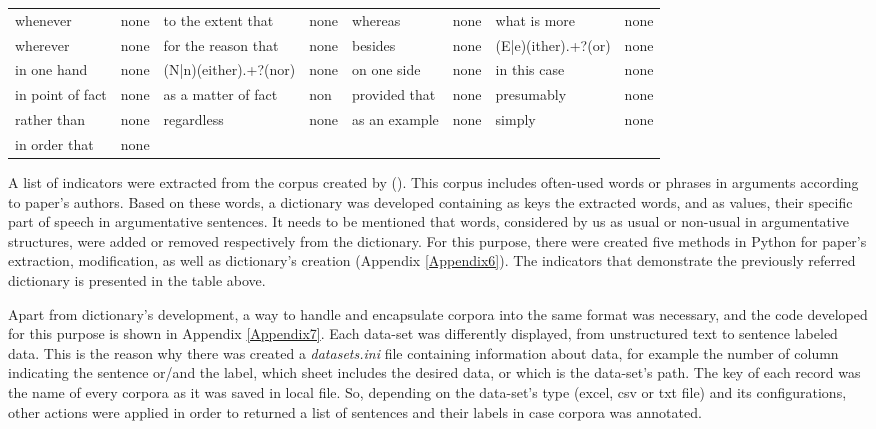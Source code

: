 {{\begin{tabular}{ |p{3.5cm}|p{1cm}|p{4cm}|p{3cm}|p{3.5cm}|p{1cm}|p{5cm}|p{2.5cm}| }
			whenever			&none		&to the extent that		&none
					&whereas			&none		&what is more						&none\\
			wherever			&none		&for the reason that	&none
					&besides			&none		&(E|e)(ither).+?(or)				&none\\
			in one hand			&none		&(N|n)(either).+?(nor)	&none
					&on one side		&none		&in this case						&none\\
			in point of fact	&none		&as a matter of fact	&non
					&provided that		&none		&presumably							&none\\
			rather than			&none		&regardless				&none
					&as an example		&none		&simply								&none\\
			in order that		&none		& 						& 
					& 					& 			& 									& 	\\ 
					
			\hline
\end{tabular}}}

A list of indicators were extracted from the corpus created by (\cite{knott1994using}). This corpus includes often-used words or phrases in arguments according to paper's authors. Based on these words, a dictionary was developed containing as keys the extracted words, and as values, their specific part of speech in argumentative sentences. It needs to be mentioned that words, considered by us as usual or non-usual in argumentative structures, were added or removed respectively from the dictionary. For this purpose, there were created five methods in Python for paper's extraction, modification, as well as dictionary's creation (Appendix \ref{Appendix6}). The indicators that demonstrate the previously referred dictionary is presented in the table above. \par

Apart from dictionary's development, a way to handle and encapsulate corpora into the same format was necessary, and the code developed for this purpose is shown in Appendix \ref{Appendix7}. Each data-set was differently displayed, from unstructured text to sentence labeled data. This is the reason why there was created a \textit{datasets.ini} file containing information about data, for example the number of column indicating the sentence or/and the label, which sheet includes the desired data, or which is the data-set's path. The key of each record was the name of every corpora as it was saved in local file. So, depending on the data-set's type (excel, csv or txt file) and its configurations, other actions were applied in order to returned a list of sentences and their labels in case corpora was annotated. \par

